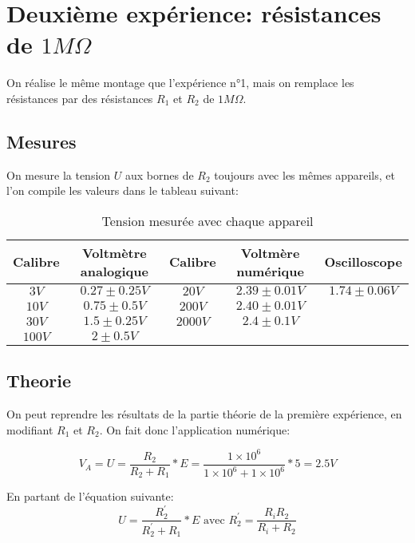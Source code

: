 \documentclass[10pt]{article}
\begin{document}
\section{Deuxième expérience: résistances de $1M \Omega$}
On réalise le même montage que l'expérience n°1, mais on remplace les résistances par des résistances $R_1$ et $R_2$ de $1M\Omega$.

\subsection{Mesures}
On mesure la tension $U$ aux bornes de $R_2$ toujours avec les mêmes appareils, et l'on compile les valeurs dans le tableau suivant:

\begin{table}[h!]
    \begin{center}
        \begin{tabular}{|c|c||c|c||c|}
            \hline
            Calibre & Voltmètre analogique & Calibre & Voltmère numérique & Oscilloscope \\
            \hline
            $3V$ & $0.27 \pm 0.25V$ & $20V$ & $2.39 \pm 0.01V$ & $1.74 \pm 0.06V$ \\
            $10V$ & $0.75 \pm 0.5V$ & $200V$ & $2.40 \pm 0.01V$ &  \\
            $30V$ & $1.5 \pm 0.25V$ & $2000V$ & $2.4 \pm 0.1V$ &  \\
            $100V$ & $2 \pm 0.5V$ & & & \\
            \hline
        \end{tabular}
        \caption{Tension mesurée avec chaque appareil}
        \label{table:table2}
    \end{center}
\end{table}

\subsection{Theorie}
On peut reprendre les résultats de la partie théorie de la première expérience, en modifiant $R_1$ et $R_2$. On fait donc 
l'application numérique:

\begin{equation}
    V_A = U = \frac{R_2}{R_2 + R_1} * E = \frac{1 \times 10^6}{1 \times 10^6 + 1 \times 10^6} * 5 = 2.5V
\end{equation}

En partant de l'équation suivante:
\begin{equation}
    U = \frac{R_2^{'}}{R_2^{'} + R_1} * E \text{ avec } R_2^{'} = \frac{R_iR_2}{R_i + R_2}
\end{equation}
\end{document}
